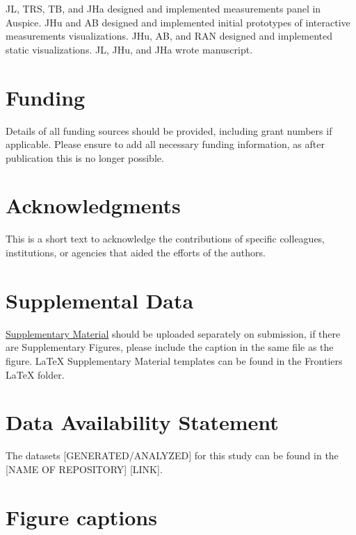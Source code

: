 \documentclass[utf8]{FrontiersinHarvard} %
\begin{document}
JL, TRS, TB, and JHa designed and implemented measurements panel in Auspice.
JHu and AB designed and implemented initial prototypes of interactive measurements visualizations.
JHu, AB, and RAN designed and implemented static visualizations.
JL, JHu, and JHa wrote manuscript.

\section*{Funding}
Details of all funding sources should be provided, including grant numbers if applicable. Please ensure to add all necessary funding information, as after publication this is no longer possible.

\section*{Acknowledgments}
This is a short text to acknowledge the contributions of specific colleagues, institutions, or agencies that aided the efforts of the authors.

\section*{Supplemental Data}
 \href{http://home.frontiersin.org/about/author-guidelines#SupplementaryMaterial}{Supplementary Material} should be uploaded separately on submission, if there are Supplementary Figures, please include the caption in the same file as the figure. LaTeX Supplementary Material templates can be found in the Frontiers LaTeX folder.

\section*{Data Availability Statement}
The datasets [GENERATED/ANALYZED] for this study can be found in the [NAME OF REPOSITORY] [LINK].





\section*{Figure captions}
\end{document}
